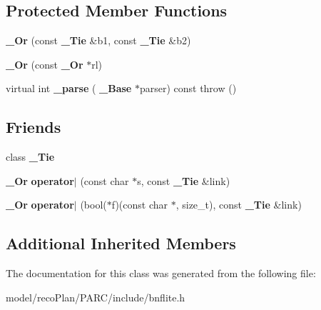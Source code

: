 \subsection*{Protected Member Functions}
\begin{DoxyCompactItemize}
\item 
\mbox{\label{classbnf_1_1___or_a6dcf19923b57986807afbefc59f5565f}} 
{\bfseries \+\_\+\+Or} (const \textbf{ \+\_\+\+Tie} \&b1, const \textbf{ \+\_\+\+Tie} \&b2)
\item 
\mbox{\label{classbnf_1_1___or_ab00468b6e1f63a99bb9703ccf65f0179}} 
{\bfseries \+\_\+\+Or} (const \textbf{ \+\_\+\+Or} $\ast$rl)
\item 
\mbox{\label{classbnf_1_1___or_a47bf693c952f0cf06ed6ba0864efcd60}} 
virtual int {\bfseries \+\_\+parse} (\textbf{ \+\_\+\+Base} $\ast$parser) const  throw ()
\end{DoxyCompactItemize}
\subsection*{Friends}
\begin{DoxyCompactItemize}
\item 
\mbox{\label{classbnf_1_1___or_ab555bd08f573aad86ad95feb76007c15}} 
class {\bfseries \+\_\+\+Tie}
\item 
\mbox{\label{classbnf_1_1___or_a0065d8a2cc1f4d7c72a2a68baf5e9dcb}} 
\textbf{ \+\_\+\+Or} {\bfseries operator$\vert$} (const char $\ast$s, const \textbf{ \+\_\+\+Tie} \&link)
\item 
\mbox{\label{classbnf_1_1___or_a821e28de6bce22c0ad96966f406fe380}} 
\textbf{ \+\_\+\+Or} {\bfseries operator$\vert$} (bool($\ast$f)(const char $\ast$, size\+\_\+t), const \textbf{ \+\_\+\+Tie} \&link)
\end{DoxyCompactItemize}
\subsection*{Additional Inherited Members}


The documentation for this class was generated from the following file\+:\begin{DoxyCompactItemize}
\item 
model/reco\+Plan/\+P\+A\+R\+C/include/bnflite.\+h\end{DoxyCompactItemize}
